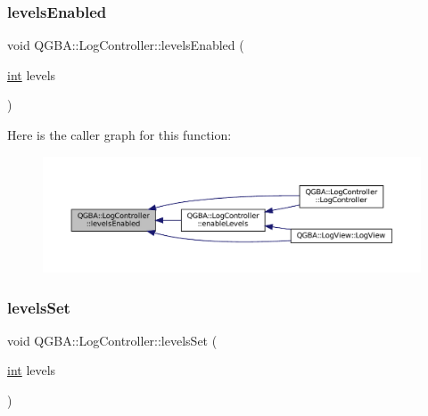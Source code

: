 \subsubsection{\texorpdfstring{levels\+Enabled}{levelsEnabled}}
{\footnotesize\ttfamily void Q\+G\+B\+A\+::\+Log\+Controller\+::levels\+Enabled (\begin{DoxyParamCaption}\item[{\mbox{\hyperlink{ioapi_8h_a787fa3cf048117ba7123753c1e74fcd6}{int}}}]{levels }\end{DoxyParamCaption})\hspace{0.3cm}{\ttfamily [signal]}}

Here is the caller graph for this function\+:
\nopagebreak
\begin{figure}[H]
\begin{center}
\leavevmode
\includegraphics[width=350pt]{class_q_g_b_a_1_1_log_controller_aaf506f4ff2d1925fb1d7a9541de3fc7a_icgraph}
\end{center}
\end{figure}
\mbox{\label{class_q_g_b_a_1_1_log_controller_ac1dea8ca81dabf4fdf0d3910b09c9677}} 
\subsubsection{\texorpdfstring{levels\+Set}{levelsSet}}
{\footnotesize\ttfamily void Q\+G\+B\+A\+::\+Log\+Controller\+::levels\+Set (\begin{DoxyParamCaption}\item[{\mbox{\hyperlink{ioapi_8h_a787fa3cf048117ba7123753c1e74fcd6}{int}}}]{levels }\end{DoxyParamCaption})\hspace{0.3cm}{\ttfamily [signal]}}

